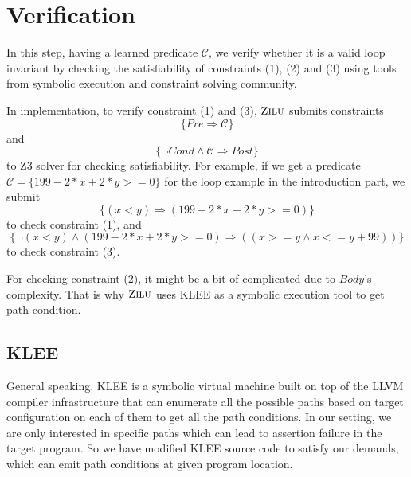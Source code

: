 
\section{Verification} %
\label{sec:verification}

In this step, having a learned predicate $\mathcal{C}$, we verify whether it is a valid loop invariant by
checking the satisfiability of constraints (1), (2) and (3) using tools from symbolic execution and constraint solving community.

In implementation, to verify constraint (1) and (3), 
$\textsc{Zilu}$ submits constraints $$\{Pre \Rightarrow \mathcal{C}\}$$ and $$\{\neg {Cond} \wedge \mathcal{C} \Rightarrow Post\}$$ to Z3 solver for checking satisfiability.
For example, if we get a predicate $\mathcal{C} = \{199-2*x+2*y>=0\}$
for the loop example in the introduction part, 
we submit 
$$\{(x<y) \Rightarrow (199-2*x+2*y>=0)\}$$
to check constraint (1), 
and 
$$\{\neg(x<y) \wedge (199-2*x+2*y>=0) \Rightarrow ((x >= y \wedge x <= y + 99))\}$$
to check constraint (3).

For checking constraint (2), it might be a bit of complicated due to $Body$'s complexity.
That is why $\textsc{Zilu}$ uses KLEE\cite{cadar2008klee} as a symbolic execution tool to get path condition.





\subsection{KLEE}
General speaking, KLEE\cite{cadar2008klee} is a symbolic virtual machine built on top of the LLVM compiler infrastructure
that can enumerate all the possible paths based on target configuration on each of them to get all the path conditions.
In our setting, we are only interested in specific paths which can lead to assertion failure in the target program.
So we have modified KLEE source code to satisfy our demands, which can emit path conditions at given program location.

